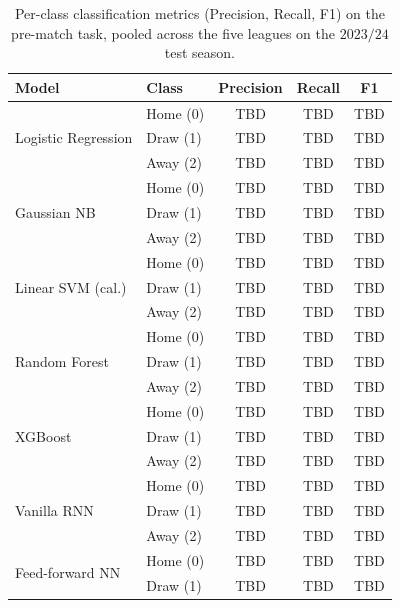 \documentclass[pdflatex,sn-mathphys-num]{sn-jnl}
\theoremstyle{thmstyleone}
\theoremstyle{thmstyletwo}
\theoremstyle{thmstylethree}
\begin{document}
\begin{table}[h]
\caption{Per-class classification metrics (Precision, Recall, F1) on
the pre-match task, pooled across the five leagues on the $2023/24$
test season.}\label{tab:pre-perclass}
\footnotesize
\begin{tabular*}{\textwidth}{@{\extracolsep\fill}llccc@{}}
\toprule
Model & Class & Precision & Recall & F1 \\
\midrule
\multirow{3}{*}{Logistic Regression} & Home (0) & TBD & TBD & TBD \\
                                     & Draw (1) & TBD & TBD & TBD \\
                                     & Away (2) & TBD & TBD & TBD \\
\midrule
\multirow{3}{*}{Gaussian NB}         & Home (0) & TBD & TBD & TBD \\
                                     & Draw (1) & TBD & TBD & TBD \\
                                     & Away (2) & TBD & TBD & TBD \\
\midrule
\multirow{3}{*}{Linear SVM (cal.)}   & Home (0) & TBD & TBD & TBD \\
                                     & Draw (1) & TBD & TBD & TBD \\
                                     & Away (2) & TBD & TBD & TBD \\
\midrule
\multirow{3}{*}{Random Forest}       & Home (0) & TBD & TBD & TBD \\
                                     & Draw (1) & TBD & TBD & TBD \\
                                     & Away (2) & TBD & TBD & TBD \\
\midrule
\multirow{3}{*}{XGBoost}             & Home (0) & TBD & TBD & TBD \\
                                     & Draw (1) & TBD & TBD & TBD \\
                                     & Away (2) & TBD & TBD & TBD \\
\midrule
\multirow{3}{*}{Vanilla RNN}         & Home (0) & TBD & TBD & TBD \\
                                     & Draw (1) & TBD & TBD & TBD \\
                                     & Away (2) & TBD & TBD & TBD \\
\midrule
\multirow{3}{*}{Feed-forward NN}     & Home (0) & TBD & TBD & TBD \\
                                     & Draw (1) & TBD & TBD & TBD \\

\end{tabular*}
\end{table}
\end{document}
